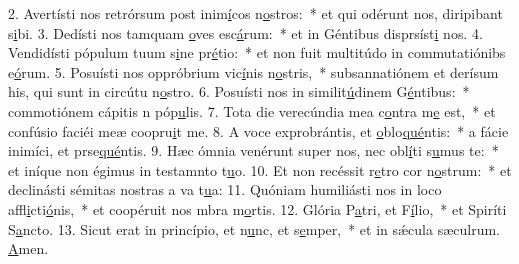 2. Avertísti nos retrórsum post inim\uline{í}cos n\uline{o}stros:~* et qui odérunt nos, diripibant s\uline{i}bi.
3. Dedísti nos tamquam \uline{o}ves esc\uline{á}rum:~* et in Géntibus disprsíst\uline{i} nos.
4. Vendidísti pópulum tuum s\uline{i}ne pr\uline{é}tio:~* et non fuit multitúdo in commutatiónibs e\uline{ó}rum.
5. Posuísti nos oppróbrium vic\uline{í}nis n\uline{o}stris,~* subsannatiónem et derísum his, qui sunt in circútu n\uline{o}stro.
6. Posuísti nos in similit\uline{ú}dinem G\uline{é}ntibus:~* commotiónem cápitis n póp\uline{u}lis.
7. Tota die verecúndia mea c\uline{o}ntra m\uline{e} est,~* et confúsio faciéi meæ coopru\uline{i}t me.
8. A voce exprobrántis, et \uline{o}blo\uline{qué}ntis:~* a fácie inimíci, et prse\uline{qué}ntis.
9. Hæc ómnia venérunt super nos, nec obl\uline{í}ti s\uline{u}mus te:~* et iníque non égimus in testamnto t\uline{u}o.
10. Et non recéssit r\uline{e}tro cor n\uline{o}strum:~* et declinásti sémitas nostras a va t\uline{u}a:
11. Quóniam humiliásti nos in loco affl\uline{i}cti\uline{ó}nis,~* et coopéruit nos mbra m\uline{o}rtis.
12. Glória P\uline{a}tri, et F\uline{í}lio,~* et Spiríti S\uline{a}ncto.
13. Sicut erat in princípio, et n\uline{u}nc, et s\uline{e}mper,~* et in sǽcula sæculrum. \uline{A}men.
